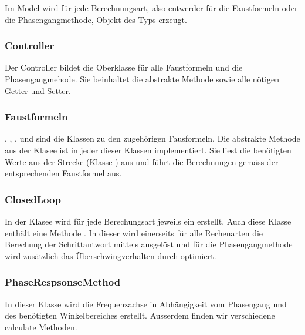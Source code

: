 Im Model wird f\"ur jede Berechnungsart, also entwerder f\"ur die Faustformeln
oder die Phasengangmethode, Objekt des Typs  erzeugt.


\subsubsection*{Controller}

Der  Controller  bildet  die  Oberklasse   f\"ur  alle  Faustformeln  und  die
Phasengangmehode. Sie  beinhaltet  die  abstrakte  Methode  
sowie alle n\"otigen Getter und Setter.


\subsubsection*{Faustformeln}

,   ,   ,      und
 sind die Klassen  zu den zugeh\"origen Fausformeln.  Die
abstrakte Methode   aus der Klasee   ist in
jeder dieser Klassen  implementiert. Sie liest die ben\"otigten  Werte aus der
Strecke (Klasse  ) aus  und f\"uhrt  die Berechnungen  gem\"ass der
entsprechenden Faustformel aus.


\subsubsection*{ClosedLoop}

In  der  Klasee     wird  f\"ur  jede  Berechungsart  jeweils
ein    erstellt. Auch  diese Klasse  enth\"alt  eine  Methode
. In   dieser  wird   einerseits   f\"ur  alle   Rechenarten
die  Berechung   der  Schrittantwort   mittels  
ausgel\"ost   und   f\"ur   die  Phasengangmethode   wird   zus\"atzlich   das
\"Uberschwingverhalten durch  optimiert.


\subsubsection*{PhaseRespsonseMethod}


In dieser Klasse  wird die Frequenzachse in Abh\"angigkeit  vom Phasengang und
des ben\"otigten Winkelbereiches erstellt.   Ausserdem finden wir verschiedene
calculate Methoden.

